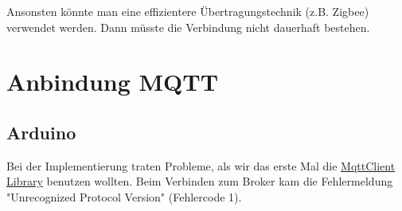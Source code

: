 \documentclass{article}
\begin{document}
Ansonsten könnte man eine effizientere Übertragungstechnik (z.B. Zigbee) verwendet werden. Dann müsste die Verbindung nicht dauerhaft bestehen.


\section{Anbindung MQTT}

\subsection{Arduino}
Bei der Implementierung traten Probleme, als wir das erste Mal die \href{https://github.com/arduino-libraries/ArduinoMqttClient}{MqttClient Library} benutzen wollten. Beim Verbinden zum Broker kam die Fehlermeldung "Unrecognized Protocol Version" (Fehlercode 1).
\end{document}
